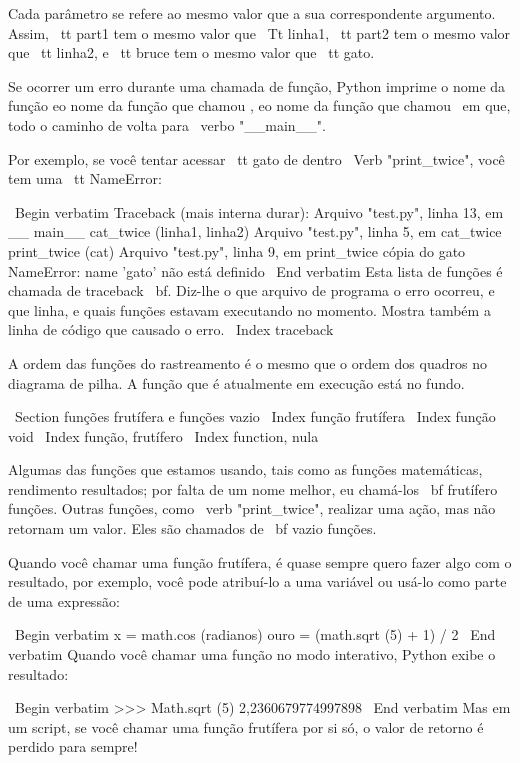 \documentclass[10pt]{book}
\begin{document}
{Cada parâmetro se refere ao mesmo valor que a sua correspondente
argumento. Assim, {\ tt part1} tem o mesmo valor que
{\ Tt linha1}, {\ tt part2} tem o mesmo valor que {\ tt linha2},
e {\ tt bruce} tem o mesmo valor que {\ tt gato}.

Se ocorrer um erro durante uma chamada de função, Python imprime o
nome da função eo nome da função que chamou
, eo nome da função que chamou {\ em que}, todo o
caminho de volta para \ verbo "__main__".

Por exemplo, se você tentar acessar {\ tt} gato de dentro 
\ Verb "print_twice", você tem uma {\ tt NameError}:

\ Begin {verbatim}
Traceback (mais interna durar):
  Arquivo "test.py", linha 13, em __ main__
    cat_twice (linha1, linha2)
  Arquivo "test.py", linha 5, em cat_twice
    print_twice (cat)
  Arquivo "test.py", linha 9, em print_twice
    cópia do gato
NameError: name 'gato' não está definido
\ End {verbatim}
%
Esta lista de funções é chamada de traceback {\ bf}. Diz-lhe o que
arquivo de programa o erro ocorreu, e que linha, e quais funções
estavam executando no momento. Mostra também a linha de código que
causado o erro.
\ Index {} traceback

A ordem das funções do rastreamento é o mesmo que o
ordem dos quadros no diagrama de pilha. A função que é
atualmente em execução está no fundo.


\ Section {funções frutífera e funções vazio}
\ Index {função frutífera}
\ Index {função void}
\ Index {função, frutífero}
\ Index {function, nula} 

Algumas das funções que estamos usando, tais como as funções matemáticas, rendimento
resultados; por falta de um nome melhor, eu chamá-los {\ bf frutífero
  funções}. Outras funções, como \ verb "print_twice", realizar uma
ação, mas não retornam um valor. Eles são chamados de {\ bf vazio
  funções}.

Quando você chamar uma função frutífera, é quase sempre
quero fazer algo com o resultado, por exemplo, você pode
atribuí-lo a uma variável ou usá-lo como parte de uma expressão:

\ Begin {verbatim}
x = math.cos (radianos)
ouro = (math.sqrt (5) + 1) / 2
\ End {verbatim}
%
Quando você chamar uma função no modo interativo, Python exibe
o resultado:

\ Begin {verbatim}
>>> Math.sqrt (5)
2,2360679774997898
\ End {verbatim}
%
Mas em um script, se você chamar uma função frutífera por si só,
o valor de retorno é perdido para sempre!

}
\end{document}
